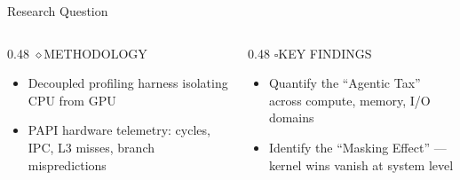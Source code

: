 \documentclass[aspectratio=169, 12pt]{beamer}
\newcommand{\iconQ}{\textcolor{accentCyan}{?}}
\newcommand{\iconCog}{\textcolor{accentGreen}{$\diamond$}}
\newcommand{\iconChart}{\textcolor{accentPurple}{$\square$}}
\begin{document}
\begin{frame}{Research Question}
  \vspace{4pt}
  \begin{center}
  \end{center}
  \vspace{8pt}
  \begin{columns}[T]
    \begin{column}{0.48\textwidth}
      {\color{accentGreen}\scriptsize\iconCog\enspace METHODOLOGY}\\[4pt]
      \begin{itemize}\itemsep3pt
        \item[\textcolor{accentCyan}{\small 1.}] Decoupled profiling harness isolating CPU from GPU
        \item[\textcolor{accentCyan}{\small 2.}] PAPI hardware telemetry: cycles, IPC, L3 misses, branch mispredictions
      \end{itemize}
    \end{column}
    \begin{column}{0.48\textwidth}
      {\color{accentPurple}\scriptsize\iconChart\enspace KEY FINDINGS}\\[4pt]
      \begin{itemize}\itemsep3pt
        \item[\textcolor{accentPurple}{\small 3.}] Quantify the ``Agentic Tax'' across compute, memory, I/O domains
        \item[\textcolor{accentPurple}{\small 4.}] Identify the ``Masking Effect'' --- kernel wins vanish at system level
      \end{itemize}
    \end{column}
  \end{columns}
\end{frame}
\end{document}

